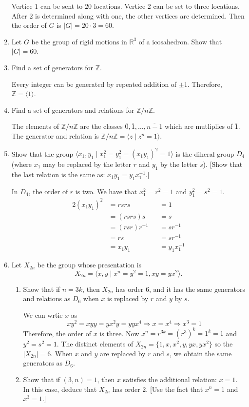 \begin{enumerate}[resume]
  Vertice \(1\) can be sent to \(20\) locations.
  Vertice \(2\) can be set to three locations.
  After \(2\) is determined along with one, the other vertices are determined.
  Then the order of \(G\) is \(\lvert G\rvert = 20\cdot 3 = 60\).
\item
  Let \(G\) be the group of rigid motions in \(\mathbb{R}^3\) of a icosahedron.
  Show that \(\lvert G\rvert = 60\).
\item
  Find a set of generators for \(\mathbb{Z}\).
  \par\smallskip
  Every integer can be generated by repeated addition of \(\pm 1\).
  Therefore, \(\mathbb{Z} = \langle 1\rangle\).
\item
  Find a set of generators and relations for \(\mathbb{Z}/n\mathbb{Z}\).
  \par\smallskip
  The elements of \(\mathbb{Z}/n\mathbb{Z}\) are the classes
  \(\bar{0},\bar{1},\ldots,\overline{n - 1}\) which are mutliplies of
  \(\bar{1}\).
  The generator and relation is
  \(\mathbb{Z}/n\mathbb{Z} = \langle z\mid z^n = 1\rangle\).
\item
  Show that the group
  \(\langle x_1,y_1\mid x_1^2 = y_1^2 = (x_1y_1)^2 = 1\rangle\) is the diheral
  group \(D_4\) (where \(x_1\) may be replaced by the letter \(r\) and \(y_1\)
  by the letter \(s\)).
  [Show that the last relation is the same as: \(x_1y_1 = y_1x_1^{-1}\).]
  \par\smallskip
  In \(D_4\), the order of \(r\) is two.
  We have that \(x_1^2 = r^2 = 1\) and \(y_1^2 = s^2 = 1\).
  \begin{alignat*}{2}
    (x_1y_1)^2 & = rsrs &&{}= 1\\
    & = (rsrs)s &&{}= s\\
    & = (rsr)r^{-1} &&{}= sr^{-1}\\
    & = rs &&{}= sr^{-1}\\
    & = x_1y_1 &&{}= y_1x_1^{-1}
  \end{alignat*}
\item
  Let \(X_{2n}\) be the group whose presentation is
  \[
  X_{2n} = \langle x,y\mid x^n = y^2 = 1, xy = yx^2\rangle.
  \]
  \begin{enumerate}[label = (\alph*)]
  \item
    Show that if \(n = 3k\), then \(X_{2n}\) has order \(6\), and it has the
    same generators and relations as \(D_6\) when \(x\) is replaced by \(r\)
    and \(y\) by \(s\).
    \par\smallskip
    We can wrtie \(x\) as
    \[
    xy^2 = xyy = yx^2y = yyx^4\Rightarrow x = x^4\Rightarrow x^3 = 1
    \]
    Therefore, the order of \(x\) is three.
    Now \(x^n = r^{3k} = (r^3)^k = 1^k = 1\) and \(y^2 = s^2 = 1\).
    The distinct elements of \(X_{2n} = \{1,x,x^2,y,yx,yx^2\}\) so the
    \(\lvert X_{2n}\rvert = 6\).
    When \(x\) and \(y\) are replaced by \(r\) and \(s\), we obtain the same
    generators as \(D_6\).
  \item
    Show that if \((3,n) = 1\), then \(x\) satisfies the additional relation:
    \(x = 1\).
    In this case, deduce that \(X_{2n}\) has order \(2\).
    [Use the fact that \(x^n = 1\) and \(x^3 = 1\).]
    \par\smallskip
    

\end{enumerate}
\end{enumerate}
